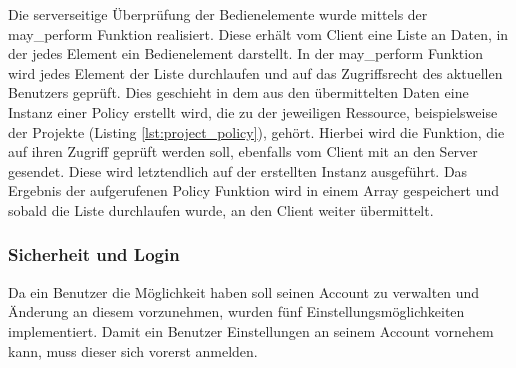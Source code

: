Die serverseitige Überprüfung der Bedienelemente wurde mittels der may\_perform Funktion realisiert. Diese erhält vom Client eine Liste an Daten, in der jedes Element ein Bedienelement darstellt. In der may\_perform Funktion wird jedes Element der Liste durchlaufen und auf das Zugriffsrecht des aktuellen Benutzers geprüft. Dies geschieht in dem aus den übermittelten Daten eine Instanz einer Policy erstellt wird, die zu der jeweiligen Ressource, beispielsweise der Projekte (Listing \ref{lst:project_policy}), gehört. Hierbei wird die Funktion, die auf ihren Zugriff geprüft werden soll, ebenfalls vom Client mit an den Server gesendet. Diese wird letztendlich auf der erstellten Instanz ausgeführt. Das Ergebnis der aufgerufenen Policy Funktion wird in einem Array gespeichert und sobald die Liste durchlaufen wurde, an den Client weiter übermittelt.

\subsubsection{Sicherheit und Login}
\label{sec:server-account-settings}
Da ein Benutzer die Möglichkeit haben soll seinen Account zu verwalten und Änderung an diesem vorzunehmen, wurden fünf Einstellungsmöglichkeiten implementiert. Damit ein Benutzer Einstellungen an seinem Account vornehem kann, muss dieser sich vorerst anmelden.

